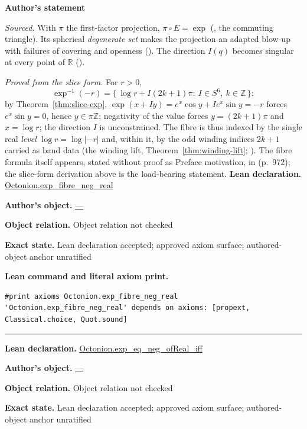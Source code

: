 \documentclass[11pt]{article}
\newcommand{\RR}{\mathbb{R}}
\newcommand{\ZZ}{\mathbb{Z}}
\theoremstyle{plain}
\theoremstyle{definition}
\theoremstyle{remark}
\begin{document}
\begin{tcolorbox}[provenancecard,title={25. Lemma - The degenerate set of the exponential; its fibre over a real value},title after break={25. Lemma - The degenerate set of the exponential; its fibre over a real value (continued)}]
\textbf{Author's statement}\par
\emph{Sourced.} With $\pi$ the first-factor projection, $\pi\circ E=\exp$
\textup{(\cite[Rem.~5.2(a)]{VS}, the commuting triangle)}. Its spherical
\emph{degenerate set} makes the projection an adapted blow-up with failures of covering and
openness \textup{(\cite[Rem.~5.2(b)]{VS})}. The direction $I(q)$ becomes singular at every
point of $\RR$ \textup{(\cite[Rem.~2.1]{GPVwind})}.

\emph{Proved from the slice form.} For $r>0$,
\[
\exp^{-1}(-r)=\bigl\{\,\log r+I(2k{+}1)\pi:\ I\in S^6,\ k\in\ZZ\,\bigr\}:
\]
by Theorem~\ref{thm:slice-exp}, $\exp(x+Iy)=e^{x}\cos y+Ie^{x}\sin y=-r$ forces
$e^{x}\sin y=0$, hence $y\in\pi\ZZ$; negativity of the value forces $y=(2k{+}1)\pi$ and
$x=\log r$; the direction $I$ is unconstrained. The fibre is thus indexed by the single real
\emph{level} $\log r=\log|{-}r|$ and, within it, by the odd winding indices $2k{+}1$ carried as
band data (the winding lift, Theorem~\ref{thm:winding-lift}; \cite[Cor.~5.21]{GPVwind}).
The fibre formula itself appears, stated without proof as Preface motivation, in \cite{VS}
(p.~972); the slice-form derivation above is the load-bearing statement.
\tcblower
\textbf{Lean declaration.} \url{Octonion.exp_fibre_neg_real}
\par\textbf{Author's object.} \url{—}
\par\textbf{Object relation.} Object relation not checked
\par\textbf{Exact state.} Lean declaration accepted; approved axiom surface; authored-object anchor unratified
\par\smallskip\textbf{Lean command and literal axiom print.}
\begin{Verbatim}[breaklines=true,breakanywhere=true,fontsize=\small]
#print axioms Octonion.exp_fibre_neg_real
'Octonion.exp_fibre_neg_real' depends on axioms: [propext, Classical.choice, Quot.sound]
\end{Verbatim}
\medskip\hrule\medskip
\textbf{Lean declaration.} \url{Octonion.exp_eq_neg_ofReal_iff}
\par\textbf{Author's object.} \url{—}
\par\textbf{Object relation.} Object relation not checked
\par\textbf{Exact state.} Lean declaration accepted; approved axiom surface; authored-object anchor unratified

\end{tcolorbox}
\end{document}
